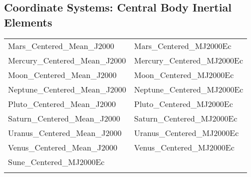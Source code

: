 \clearpage
\subsection{Coordinate Systems: Central Body Inertial Elements}
\begin{table}[ht!]
\centering
    \begin{tabular}{ll}
    Mars\_Centered\_Mean\_J2000 & Mars\_Centered\_MJ2000Ec\\
    Mercury\_Centered\_Mean\_J2000 & Mercury\_Centered\_MJ2000Ec\\
    Moon\_Centered\_Mean\_J2000 & Moon\_Centered\_MJ2000Ec\\
    Neptune\_Centered\_Mean\_J2000 & Neptune\_Centered\_MJ2000Ec\\
    Pluto\_Centered\_Mean\_J2000 & Pluto\_Centered\_MJ2000Ec\\
    Saturn\_Centered\_Mean\_J2000 & Saturn\_Centered\_MJ2000Ec\\
    Uranus\_Centered\_Mean\_J2000 & Uranus\_Centered\_MJ2000Ec\\
    Venus\_Centered\_Mean\_J2000 & Venus\_Centered\_MJ2000Ec\\
    Sune\_Centered\_MJ2000Ec & \\
    \label{Table: AstroCbInertial}
\end{tabular}
\end{table}

